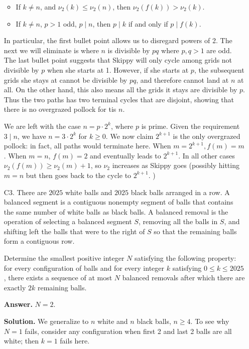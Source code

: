 \documentclass[11pt,a4paper]{article}
\begin{document}
\begin{enumerate}
\begin{itemize}
    		\item If $k\neq n$, and $\nu_2(k)\le \nu_2(n)$, then $\nu_2(f(k)) > \nu_2(k)$. 
    		
    		\item If $k\neq n$, $p > 1$ odd, $p\mid n$, then $p\mid k$ if and only if $p\mid f(k)$. 
    	\end{itemize}
        In particular, the first bullet point allows us to disregard powers of 2. 
        The next we will eliminate is where $n$ is divisible by $pq$ where $p, q > 1$ are odd. 
        The last bullet point suggests that Skippy will only cycle among grids not divisible by $p$ when she starts at 1. 
        However, if she starts at $p$, the subsequent grids she stays at cannot be divisible by $pq$, 
        and therefore cannot land at $n$ at all. 
        On the other hand, this also means all the grids it stays are divisible by $p$. 
        Thus the two paths has two terminal cycles that are disjoint, showing that there is no overgrazed pollock for tis $n$. 
        
        We are left with the case $n=p\cdot 2^k$, where $p$ is prime. 
        Given the requirement $3\mid n$, we have $n = 3\cdot 2^k$ for $k\ge 0$. 
        We now claim $2^{k+1}$ is the only overgrazed pollock: 
        in fact, all paths would terminate here.
        When $m=2^{k+1}, f(m)=m$. 
        When $m=n$, $f(m)=2$ and eventually leads to $2^{k+1}$. 
        In all other cases $\nu_2(f(m))\ge \nu_2(m) + 1$, so $\nu_2$ increases as Skippy goes 
        (possibly hitting $m=n$ but then goes back to the cycle to $2^{k+1}$. )
    	
    	\item [C3.]
    	There are $2025$ white balls and $2025$ black balls arranged in a row. A balanced segment is a contiguous nonempty segment of balls that contains the same number of white balls as black balls. A balanced removal is the operation of selecting a balanced segment $S$, removing all the balls in $S$, and shifting left the balls that were to the right of $S$ so that the remaining balls form a contiguous row.
    	
    	Determine the smallest positive integer $N$ satisfying the following property: for every configuration of balls and for every integer $k$ satisfying $0\le k\le2025$, there exists a sequence of at most $N$ balanced removals after which there are exactly $2k$ remaining balls.
    	
    	\textbf{Answer.} $N = 2$. 
    	
    	\textbf{Solution.} We generalize to $n$ white and $n$ black balls, $n\ge 4$. 
    	To see why $N = 1$ fails, 
    	consider any configuration when first 2 and last 2 balls are all white; then $k = 1$ fails here. 
    	

\end{enumerate}
\end{document}
